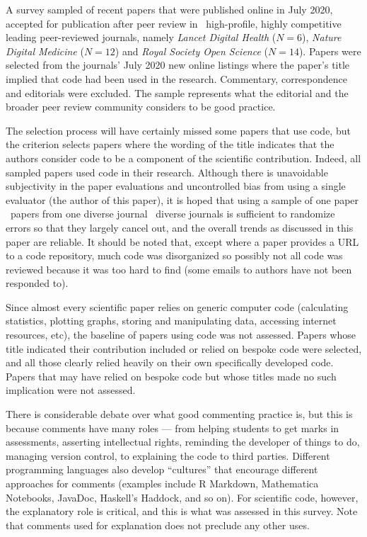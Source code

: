 \documentclass{article}
\def\plural#1#2{\ifnum #1=1 
	one #2%
\else
	\the#1\ #2s%
\fi}
\def\journalBreakdown{\emph{Lancet Digital Health\/} ($N=6$), \emph{Nature Digital Medicine\/} ($N=12$) and \emph{Royal Society Open Science\/} ($N=14$)}
\begin{document}


\label{data-methods-section}
\label{data-methods-subsection}
A survey sampled of recent papers that were published online in July 2020, accepted for publication after peer review in \the\numberOfJournals\ high-profile, highly competitive leading peer-reviewed journals, namely \journalBreakdown. Papers were selected from the journals' July 2020 new online listings where the paper's title implied that code had been used in the research. Commentary, correspondence and editorials were excluded. The sample represents what the editorial and the broader peer review community considers to be good practice. 

The selection process will have certainly missed some papers that use code, but the criterion selects papers where the wording of the title indicates that the authors consider code to be a component of the scientific contribution. Indeed, all sampled papers used code in their research.  Although there is unavoidable subjectivity in the paper evaluations and uncontrolled bias from using a single evaluator (the author of this paper), it is hoped that using a sample of \plural{\dataN}{paper} from \plural{\numberOfJournals}{diverse journal} is sufficient to randomize errors so that they largely cancel out, and the overall trends as discussed in this paper are reliable. It should be noted that, except where a paper provides a URL to a code repository, much code was disorganized so possibly not all code was reviewed because it was too hard to find (some emails to authors have not been responded to). 
 
Since almost every scientific paper relies on generic computer code (calculating statistics, plotting graphs, storing and manipulating data, accessing internet resources, etc), the baseline of papers using code was not assessed. Papers whose title indicated their contribution included or relied on bespoke code were selected, and all those clearly relied heavily on their own specifically developed code. Papers that may have relied on bespoke code but whose titles made no such implication were not assessed.

There is considerable debate over what good commenting practice is, but this is because comments have many roles --- from helping students to get marks in assessments, asserting intellectual rights, reminding the developer of things to do, managing version control, to explaining the code to third parties. Different programming languages also develop ``cultures'' that encourage different approaches for comments (examples include R Markdown, Mathematica Notebooks, JavaDoc, Haskell's Haddock, and so on). For scientific code, however, the explanatory role is critical, and this is what was assessed in this survey. Note that comments used for explanation does not preclude any other uses.
\end{document}
